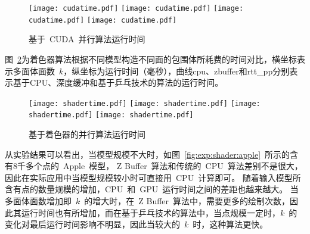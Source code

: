 \begin{figure}[htbp] %
\centering
{  
   \texttt{[image: cudatime.pdf]}
}
{  
    \texttt{[image: cudatime.pdf]}
}\linebreak %
{  
   \texttt{[image: cudatime.pdf]}
}
{  
   \texttt{[image: cudatime.pdf]}
}
\caption{基于~CUDA~并行算法运行时间}
\label{fig:chart:exps:cputime}
\end{figure}

图~\ref{fig:chart:exps:shadertime}为着色器算法根据不同模型构造不同面的包围体所耗费的时间对比，横坐标表示多面体面数~$k$，纵坐标为运行时间（毫秒），曲线cpu、zbuffer和rtt\_pp分别表示基于CPU、深度缓冲和基于乒乓技术的算法的运行时间。

\begin{figure}[htbp] %
\centering
{}
{  
   \texttt{[image: shadertime.pdf]}
}
{  
    \texttt{[image: shadertime.pdf]}
}\linebreak %
{  
   \texttt{[image: shadertime.pdf]}
}
{  
   \texttt{[image: shadertime.pdf]}
}
\caption{基于着色器的并行算法运行时间}
\label{fig:chart:exps:shadertime}
\end{figure}

从实验结果可以看出，当模型规模不大时，如图~\ref{fig:exp:shader:apple}~所示的含有8千多个点的~Apple~模型，
Z Buffer~算法和传统的~CPU~算法差别不是很大，因此在实际应用中当模型规模较小时可直接用~CPU~计算即可。
随着输入模型所含有点的数量规模的增加，CPU~和~GPU~运行时间之间的差距也越来越大。
当多面体面数增加即~$k$~的增大时，在~Z Buffer~算法中，需要更多的绘制次数，因此其运行时间也有所增加，而在基于乒乓技术的算法中，当点规模一定时，$k$~的变化对最后运行时间影响不明显，因此当较大的~$k$~时，这种算法更快。

